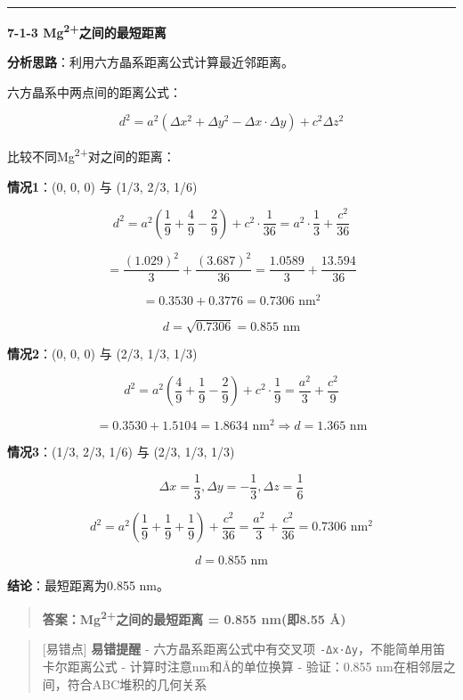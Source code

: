 \documentclass[a4paper,11pt]{ctexart}
\newcommand{\箭}{\ensuremath{\rightarrow}}
\newcommand{\左箭}{\ensuremath{\leftarrow}}
\newcommand{\上箭}{\ensuremath{\uparrow}}
\newcommand{\下箭}{\ensuremath{\downarrow}}
\newcommand{\衡}{\ensuremath{\rightleftharpoons}}
\newcommand{\双箭}{\ensuremath{\leftrightarrow}}
\newcommand{\约等于}{\ensuremath{\approx}}
\newcommand{\小于等于}{\ensuremath{\leq}}
\newcommand{\大于等于}{\ensuremath{\geq}}
\newcommand{\不等于}{\ensuremath{\neq}}
\newcommand{\西格马}{\ensuremath{\sigma}}
\newcommand{\派}{\ensuremath{\pi}}
\begin{document}
\begin{center}\rule{0.5\linewidth}{0.5pt}\end{center}

\textbf{7-1-3 Mg\textsuperscript{2+}之间的最短距离}

\textbf{分析思路}：利用六方晶系距离公式计算最近邻距离。

六方晶系中两点间的距离公式：

\[d^2 = a^2(\Delta x^2 + \Delta y^2 - \Delta x \cdot \Delta y) + c^2 \Delta z^2\]

比较不同Mg\textsuperscript{2+}对之间的距离：

\textbf{情况1}：(0, 0, 0) 与 (1/3, 2/3, 1/6)

\[d^2 = a^2\left(\frac{1}{9} + \frac{4}{9} - \frac{2}{9}\right) + c^2 \cdot \frac{1}{36} = a^2 \cdot \frac{1}{3} + \frac{c^2}{36}\]

\[= \frac{(1.029)^2}{3} + \frac{(3.687)^2}{36} = \frac{1.0589}{3} + \frac{13.594}{36}\]

\[= 0.3530 + 0.3776 = 0.7306 \text{ nm}^2\]

\[d = \sqrt{0.7306} = 0.855 \text{ nm}\]

\textbf{情况2}：(0, 0, 0) 与 (2/3, 1/3, 1/3)

\[d^2 = a^2\left(\frac{4}{9} + \frac{1}{9} - \frac{2}{9}\right) + c^2 \cdot \frac{1}{9} = \frac{a^2}{3} + \frac{c^2}{9}\]

\[= 0.3530 + 1.5104 = 1.8634 \text{ nm}^2 \Rightarrow d = 1.365 \text{ nm}\]

\textbf{情况3}：(1/3, 2/3, 1/6) 与 (2/3, 1/3, 1/3)

\[\Delta x = \frac{1}{3}, \Delta y = -\frac{1}{3}, \Delta z = \frac{1}{6}\]

\[d^2 = a^2\left(\frac{1}{9} + \frac{1}{9} + \frac{1}{9}\right) + \frac{c^2}{36} = \frac{a^2}{3} + \frac{c^2}{36} = 0.7306 \text{ nm}^2\]

\[d = 0.855 \text{ nm}\]

\textbf{结论}：最短距离为0.855 nm。

\begin{quote}
\textbf{答案：Mg\textsuperscript{2+}之间的最短距离 = 0.855 nm(即8.55 Å)}
\end{quote}

\begin{quote}
{[}易错点{]} \textbf{易错提醒}
- 六方晶系距离公式中有交叉项 \texttt{-Δx·Δy}，不能简单用笛卡尔距离公式
- 计算时注意nm和Å的单位换算
- 验证：0.855 nm在相邻层之间，符合ABC堆积的几何关系
\end{quote}
\end{document}
